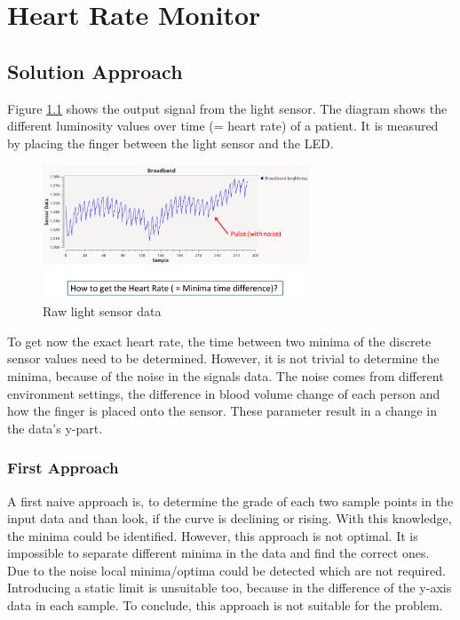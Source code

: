 \documentclass[notitlepage]{scrreprt}
\begin{document}
\chapter{Heart Rate Monitor}
\label{chap:hrm}
\section{Solution Approach}
Figure \ref{fig:raw-data} shows the output signal from the light sensor. The diagram shows the different luminosity values over time (= heart rate) of a patient. It is measured by placing the finger between the light sensor and the LED.

\begin{figure}[H]
	\centering
	\includegraphics[width=300px]{images/rawData.png}
	\caption{Raw light sensor data}
	\label{fig:raw-data}
\end{figure}

To get now the exact heart rate, the time between two minima of the discrete sensor values need to be determined. However, it is not trivial to determine the minima, because of the noise in the signals data. The noise comes from different environment settings, the difference in blood volume change of each person and how the finger is placed onto the sensor. These parameter result in a change in the data's y-part.

\subsection{First Approach}
A first naive approach is, to determine the grade of each two sample points in the input data and than look, if the curve is declining or rising. With this knowledge, the minima could be identified. However, this approach is not optimal. It is impossible to separate different minima in the data and find the correct ones. Due to the noise local minima/optima could be detected which are not required. Introducing a static limit is unsuitable too, because in the difference of the y-axis data in each sample. To conclude, this approach is not suitable for the problem.
\end{document}
